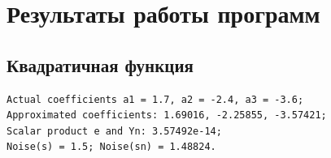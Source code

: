 \documentclass{article}
\begin{document}
    \section{Результаты работы программ} 
    \subsection{Квадратичная функция}
        \begin{verbatim}
Actual coefficients a1 = 1.7, a2 = -2.4, a3 = -3.6;
Approximated coefficients: 1.69016, -2.25855, -3.57421;
Scalar product e and Yn: 3.57492e-14;
Noise(s) = 1.5; Noise(sn) = 1.48824.        
        \end{verbatim}
        \begin{figure}[h]
        \end{figure} 
    \newpage    
\end{document}
